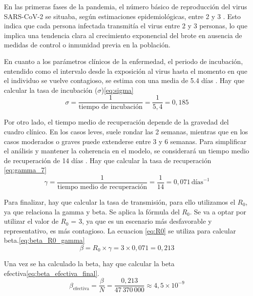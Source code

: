 En las primeras fases de la pandemia, el número básico de reproducción del virus SARS-CoV-2 se situaba, según estimaciones epidemiológicas, entre 2 y 3 \cite{garcia_r0_desescalada}. Esto indica que cada persona infectada transmitía el virus entre 2 y 3 personas, lo que implica una tendencia clara al crecimiento exponencial del brote en ausencia de medidas de control o inmunidad previa en la población.

En cuanto a los parámetros clínicos de la enfermedad, el periodo de incubación, entendido como el intervalo desde la exposición al virus hasta el momento en que el individuo se vuelve contagioso, se estima con una media de 5.4 días \cite{lauer2020incubation}. Hay que calcular la tasa de incubación ($\sigma$)\eqref{eq:sigma}
\begin{equation}
\sigma = \frac{1}{\text{tiempo de incubación}} = \frac{1}{5{,}4} = 0{,}185
\label{eq:sigma}
\end{equation}

Por otro lado, el tiempo medio de recuperación depende de la gravedad del cuadro clínico. En los casos leves, suele rondar las 2 semanas, mientras que en los casos moderados o graves puede extenderse entre 3 y 6 semanas. Para simplificar el análisis y mantener la coherencia en el modelo, se considerará un tiempo medio de recuperación de 14 días \cite{ada_duracion_covid}. Hay que calcular la tasa de recuperación \eqref{eq:gamma_7}
\begin{equation}
\gamma = \frac{1}{\text{tiempo medio de recuperación}} = \frac{1}{14} = 0{,}071 \,\text{días}^{-1}
\label{eq:gamma_7}
\end{equation}

Para finalizar, hay que calcular la tasa de transmisión, para ello utilizamos el $R_0$, ya que relaciona la gamma y beta. Se aplica la fórmula del $R_0$. Se va a optar por utilizar el valor de $R_0$ = 3, ya que es un escenario más desfavorable y representativo, es más contagioso. La ecuacion \eqref{eq:R0} se utiliza para calcular beta.\eqref{eq:beta_R0_gamma}
\begin{equation}
\beta = R_0 \times \gamma = 3 \times 0{,}071 = 0{,}213
\label{eq:beta_R0_gamma}
\end{equation}

Una vez se ha calculado la beta, hay que calcular la beta efectiva\eqref{eq:beta_efectiva_final}.
\begin{equation}
\beta_{\text{efectiva}} = \frac{\beta}{N} = \frac{0{,}213}{47\,370\,000} \approx 4{,}5 \times 10^{-9}
\label{eq:beta_efectiva_final}
\end{equation}



